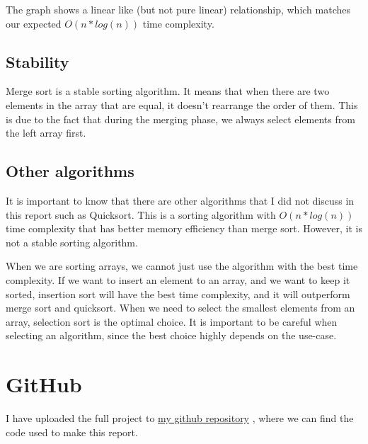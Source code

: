 \documentclass[a4paper,11pt]{article}
\newcommand{\underlinehref}[2]{%
    \href{#1}{\ul{#2}}%
}
\begin{document}
    The graph shows a linear like (but not pure linear) relationship, which matches our expected $O(n*log(n))$ time complexity.

    \subsection*{Stability}

    Merge sort is a stable sorting algorithm.
    It means that when there are two elements in the array that are equal, it doesn't rearrange the order of them.
    This is due to the fact that during the merging phase, we always select elements from the left array first.

    \subsection*{Other algorithms}

    It is important to know that there are other algorithms that I did not discuss in this report such as Quicksort.
    This is a sorting algorithm with $O(n*log(n))$ time complexity that has better memory efficiency than merge sort.
    However, it is not a stable sorting algorithm.

    When we are sorting arrays, we cannot just use the algorithm with the best time complexity.
    If we want to insert an element to an array, and we want to keep it sorted, insertion sort will have the best time complexity, and it will outperform merge sort and quicksort.
    When we need to select the smallest elements from an array, selection sort is the optimal choice.
    It is important to be careful when selecting an algorithm, since the best choice highly depends on the use-case.

    \section*{GitHub}
    I have uploaded the full project to \underlinehref{https://github.com/peterherczku/ID1021/tree/main/assignment-4}{my github repository}, where we can find the code used to make this report.
\end{document}
